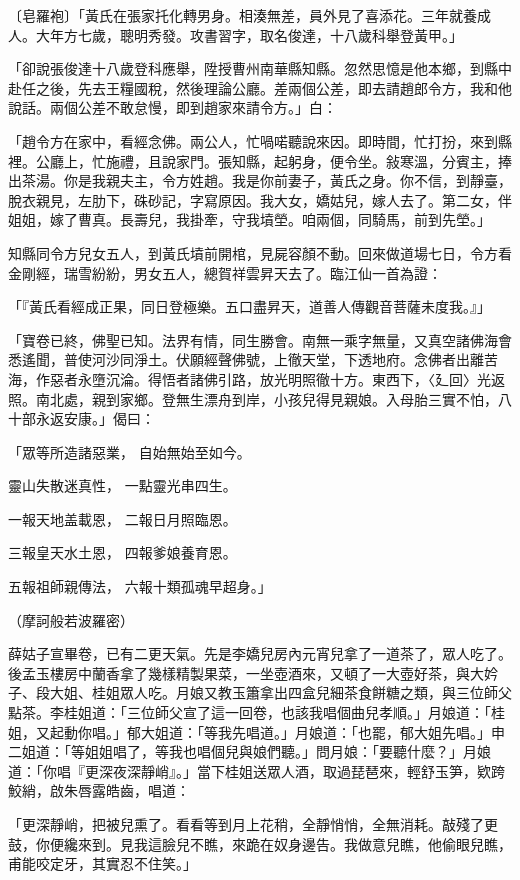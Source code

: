 〔皂羅袍〕「黃氏在張家托化轉男身。相湊無差，員外見了喜添花。三年就養成人。大年方七歲，聰明秀發。攻書習字，取名俊達，十八歲科舉登黃甲。」

「卻說張俊達十八歲登科應舉，陞授曹州南華縣知縣。忽然思憶是他本鄉，到縣中赴任之後，先去王糧國稅，然後理論公廳。差兩個公差，即去請趙郎令方，我和他說話。兩個公差不敢怠慢，即到趙家來請令方。」白：

「趙令方在家中，看經念佛。兩公人，忙喎喏聽說來因。即時間，忙打扮，來到縣裡。公廳上，忙施禮，且說家門。張知縣，起躬身，便令坐。敍寒溫，分賓主，捧出茶湯。你是我親夫主，令方姓趙。我是你前妻子，黃氏之身。你不信，到靜臺，脫衣親見，左肋下，硃砂記，字寫原因。我大女，嬌姑兒，嫁人去了。第二女，伴姐姐，嫁了曹真。長壽兒，我掛牽，守我墳塋。咱兩個，同騎馬，前到先塋。」

知縣同令方兒女五人，到黃氏墳前開棺，見屍容顏不動。回來做道場七日，令方看金剛經，瑞雪紛紛，男女五人，總賀祥雲昇天去了。臨江仙一首為證：

「『黃氏看經成正果，同日登極樂。五口盡昇天，道善人傳觀音菩薩未度我。』」

「寶卷已終，佛聖已知。法界有情，同生勝會。南無一乘字無量，又真空諸佛海會悉遙聞，普使河沙同淨土。伏願經聲佛號，上徹天堂，下透地府。念佛者出離苦海，作惡者永墮沉淪。得悟者諸佛引路，放光明照徹十方。東西下，〈廴回〉光返照。南北處，親到家鄉。登無生漂舟到岸，小孩兒得見親娘。入母胎三實不怕，八十部永返安康。」偈曰：

「眾等所造諸惡業，  自始無始至如今。

靈山失散迷真性，  一點靈光串四生。

一報天地盖載恩，  二報日月照臨恩。

三報皇天水土恩，  四報爹娘養育恩。

五報祖師親傳法，  六報十類孤魂早超身。」

（摩訶般若波羅密）

薛姑子宣畢卷，已有二更天氣。先是李嬌兒房內元宵兒拿了一道茶了，眾人吃了。後孟玉樓房中蘭香拿了幾樣精製果菜，一坐壺酒來，又頓了一大壺好茶，與大妗子、段大姐、桂姐眾人吃。月娘又教玉簫拿出四盒兒細茶食餅糖之類，與三位師父點茶。李桂姐道：「三位師父宣了這一回卷，也該我唱個曲兒孝順。」月娘道：「桂姐，又起動你唱。」郁大姐道：「等我先唱道。」月娘道：「也罷，郁大姐先唱。」申二姐道：「等姐姐唱了，等我也唱個兒與娘們聽。」問月娘：「要聽什麼？」月娘道：「你唱『更深夜深靜峭』。」當下桂姐送眾人酒，取過琵琶來，輕舒玉笋，欵跨鮫綃，啟朱唇露皓齒，唱道：

「更深靜峭，把被兒熏了。看看等到月上花稍，全靜悄悄，全無消耗。敲殘了更鼓，你便纔來到。見我這臉兒不瞧，來跪在奴身邊告。我做意兒瞧，他偷眼兒瞧，甫能咬定牙，其實忍不住笑。」

